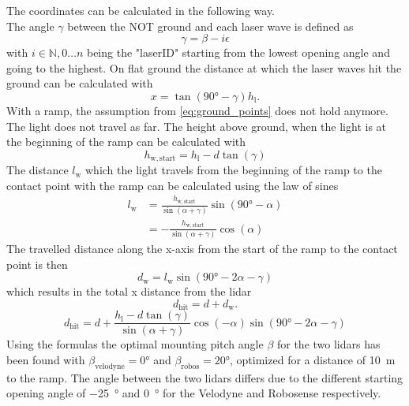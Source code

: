The coordinates can be calculated in the following way.\\
The angle $\gamma$ between the NOT ground and each laser wave is defined as
\begin{equation}
	\gamma = \beta - i\epsilon
\end{equation}
with $i \in \mathbb{N}, 0\dots n$ being the "laserID" starting from the lowest opening angle and going to the highest.
On flat ground the distance at which the laser waves hit the ground can be calculated with
\begin{equation}
	x = \tan(\ang{90} - \gamma) h_\mathrm{l}.
	\label{eq:ground_points}
\end{equation}
With a ramp, the assumption from \cref{eq:ground_points} does not hold anymore.
The light does not travel as far.
The height above ground, when the light is at the beginning of the ramp can be calculated with
\begin{equation}
	h_\mathrm{w,start} = h_\mathrm{l} - d\tan(\gamma)
\end{equation}
The distance $l_\mathrm{w}$ which the light travels from the beginning of the ramp to the contact point with the ramp can be calculated using the law of sines
\begin{align}
	l_\mathrm{w} & = \frac{h_\mathrm{w,start} }{\sin(\alpha + \gamma)} \sin(\ang{90} - \alpha) \\
	             & = -\frac{h_\mathrm{w,start} }{\sin(\alpha + \gamma)} \cos(\alpha)
\end{align}
The travelled distance along the x-axis from the start of the ramp to the contact point is then
\begin{equation}
	d_\mathrm{w}  = l_\mathrm{w} \sin(\ang{90} - 2\alpha - \gamma)
\end{equation}
which results in the total x distance from the \gls{lidar}
\begin{equation}
	d_\mathrm{hit} = d + d_\mathrm{w}.
\end{equation}
\begin{equation}
	d_\mathrm{hit} = d + \frac{h_\mathrm{l} - d\tan(\gamma)}{\sin(\alpha + \gamma)} \cos(-\alpha) \sin(\ang{90} - 2\alpha - \gamma)
\end{equation}
Using the formulas the optimal mounting pitch angle $\beta$ for the two \gls{lidar}s has been found with $\beta_\mathrm{velodyne} = \ang{0}$ and $\beta_\mathrm{robos} = \ang{20}$, optimized for a distance of \SI{10}{\metre} to the ramp.
The angle between the two \gls{lidar}s differs due to the different starting opening angle of \SI{-25}{\degree} and \SI{0}{\degree} for the Velodyne and Robosense respectively.



